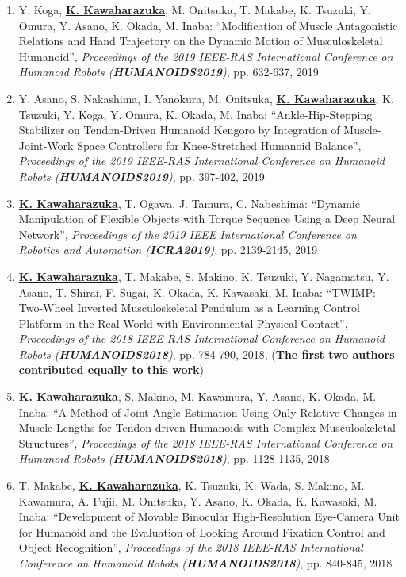 \documentclass[letterpaper]{article}
\begin{document}
\begin{enumerate}
\item Y. Koga, \underline{\textbf{K. Kawaharazuka}}, M. Onitsuka, T. Makabe, K. Tsuzuki, Y. Omura, Y. Asano, K. Okada, M. Inaba: ``Modification of Muscle Antagonistic Relations and Hand Trajectory on the Dynamic Motion of Musculoskeletal Humanoid'', \textit{Proceedings of the 2019 IEEE-RAS International Conference on Humanoid Robots (\textit{\textbf{HUMANOIDS2019}})}, pp. 632-637, 2019
\item Y. Asano, S. Nakashima, I. Yanokura, M. Onitsuka, \underline{\textbf{K. Kawaharazuka}}, K. Tsuzuki, Y. Koga, Y. Omura, K. Okada, M. Inaba: ``Ankle-Hip-Stepping Stabilizer on Tendon-Driven Humanoid Kengoro by Integration of Muscle-Joint-Work Space Controllers for Knee-Stretched Humanoid Balance'', \textit{Proceedings of the 2019 IEEE-RAS International Conference on Humanoid Robots (\textit{\textbf{HUMANOIDS2019}})}, pp. 397-402, 2019
\item \underline{\textbf{K. Kawaharazuka}}, T. Ogawa, J. Tamura, C. Nabeshima: ``Dynamic Manipulation of Flexible Objects with Torque Sequence Using a Deep Neural Network'', \textit{Proceedings of the 2019 IEEE International Conference on Robotics and Automation (\textit{\textbf{ICRA2019}})}, pp. 2139-2145, 2019
\item \underline{\textbf{K. Kawaharazuka}}, T. Makabe, S. Makino, K. Tsuzuki, Y. Nagamatsu, Y. Asano, T. Shirai, F. Sugai, K. Okada, K. Kawasaki, M. Inaba: ``TWIMP: Two-Wheel Inverted Musculoskeletal Pendulum as a Learning Control Platform in the Real World with Environmental Physical Contact'', \textit{Proceedings of the 2018 IEEE-RAS International Conference on Humanoid Robots (\textit{\textbf{HUMANOIDS2018}})}, pp. 784-790, 2018, (\textbf{The first two authors contributed equally to this work})
\item \underline{\textbf{K. Kawaharazuka}}, S. Makino, M. Kawamura, Y. Asano, K. Okada, M. Inaba: ``A Method of Joint Angle Estimation Using Only Relative Changes in Muscle Lengths for Tendon-driven Humanoids with Complex Musculoskeletal Structures'', \textit{Proceedings of the 2018 IEEE-RAS International Conference on Humanoid Robots (\textit{\textbf{HUMANOIDS2018}})}, pp. 1128-1135, 2018
\item T. Makabe, \underline{\textbf{K. Kawaharazuka}}, K. Tsuzuki, K. Wada, S. Makino, M. Kawamura, A. Fujii, M. Onitsuka, Y. Asano, K. Okada, K. Kawasaki, M. Inaba: ``Development of Movable Binocular High-Resolution Eye-Camera Unit for Humanoid and the Evaluation of Looking Around Fixation Control and Object Recognition'', \textit{Proceedings of the 2018 IEEE-RAS International Conference on Humanoid Robots (\textit{\textbf{HUMANOIDS2018}})}, pp. 840-845, 2018

\end{enumerate}
\end{document}
